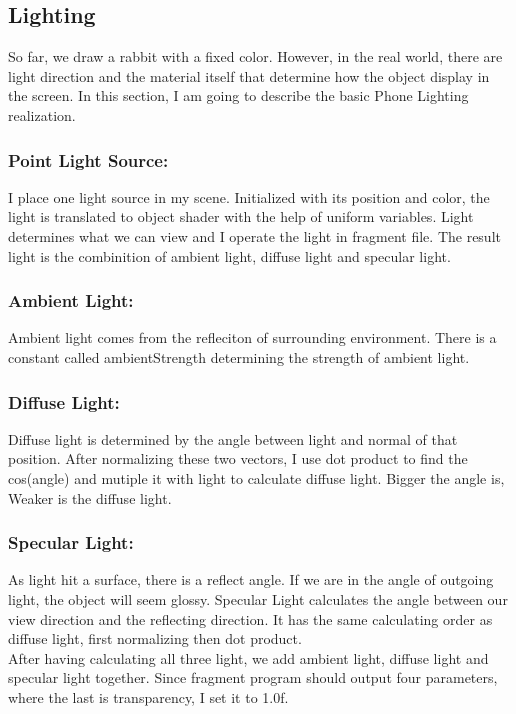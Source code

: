 \documentclass[acmtog]{acmart}
\begin{document}
\subsection{Lighting}
So far, we draw a rabbit with a fixed color. However, in the real world, there are light direction and the material itself that determine how the object display in the screen. In this section, I am going to describe the basic Phone Lighting realization.
\subsubsection{Point Light Source: }
I place one light source in my scene. Initialized with its position and color, the light is translated to object shader with the help of uniform variables. Light determines what we can view and I operate the light in fragment file. The result light is the combinition of ambient light, diffuse light and specular light.
\subsubsection{Ambient Light: }
Ambient light comes from the refleciton of surrounding environment. There is a constant called ambientStrength determining the strength of ambient light.
\subsubsection{Diffuse Light: }
Diffuse light is determined by the angle between light and normal of that position. After normalizing these two vectors, I use dot product to find the cos(angle) and mutiple it with light to calculate diffuse light. Bigger the angle is, Weaker is the diffuse light.
\subsubsection{Specular Light: }
As light hit a surface, there is a reflect angle. If we are in the angle of outgoing light, the object will seem glossy. Specular Light calculates the angle between our view direction and the reflecting direction. It has the same calculating order as diffuse light, first normalizing then dot product.\\
After having calculating all three light, we add ambient light, diffuse light and specular light together. Since fragment program should output four parameters, where the last is transparency, I set it to 1.0f.
\end{document}
